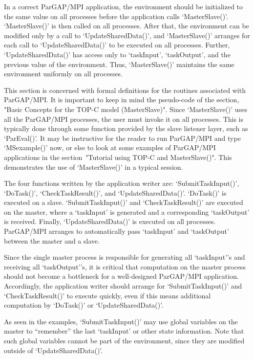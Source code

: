 In a correct ParGAP/MPI application, the environment should be
initialized to the same value on all processes before the application
calls `MasterSlave()'.
`MasterSlave()' is then called on all processes.
After that, the environment can be modified only by a call to
`UpdateSharedData()', and `MasterSlave()' arranges for each call to
`UpdateSharedData()' to be executed on all processes.  Further,
`UpdateSharedData()' has access only to `taskInput',
`taskOutput', and the previous value of the environment.
Thus, `MasterSlave()' maintains the same environment uniformly on
all processes.


This section is concerned with formal definitions for the routines
associated with ParGAP/MPI.  It is important to keep in mind the
pseudo-code of the section, "Basic Concepts for the TOP-C model
(MasterSlave)".  Since `MasterSlave()' uses all the ParGAP/MPI
processes, the user must invoke it on all processes.  This is
typically done through some function provided by the slave listener
layer, such as `ParEval()'. It may be instructive for the reader to
run ParGAP/MPI and type `MSexample()' now, or else to look at some
examples of ParGAP/MPI applications in the section~"Tutorial using
TOP-C and MasterSlave()".  This demonstrates the use of `MasterSlave()'
in a typical session.

The four functions written by the application writer are:
`SubmitTaskInput()', `DoTask()', `CheckTaskResult()',
and `UpdateSharedData()'.
`DoTask()' is executed on a slave.  `SubmitTaskInput()'
and `CheckTaskResult()' are executed on the master, where a
`taskInput' is generated and a corresponding `taskOutput' is
received.  Finally, `UpdateSharedData()' is executed on all
processes.  ParGAP/MPI arranges to automatically pass `taskInput' and
`taskOutput' between the master and a slave.

Since the single master process is responsible for generating all
`taskInput''s and receiving all `taskOutput''s, it is critical that
computation on the master process should not become a bottleneck for a
well-designed ParGAP/MPI application.  Accordingly, the application
writer should arrange for `SubmitTaskInput()' and
`CheckTaskResult()' to
execute quickly, even if this means additional computation by
`DoTask()' or `UpdateSharedData()'.

As seen in the examples, `SubmitTaskInput()' may use global variables on
the master to ``remember'' the last `taskInput' or other state
information.  Note that such global variables cannot be part of the
environment, since they are modified outside of `UpdateSharedData()'.

